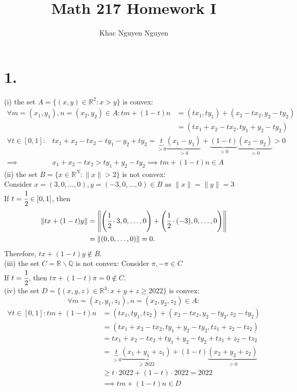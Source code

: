 \documentclass[11pt]{article}
\title{\textbf{Math 217 Homework I}}
\author{Khac Nguyen Nguyen}
\date{}
\begin{document}
\section*{1.}
(i) the set $ A = \{ (x,y) \in \mathbb{R}^2: x>y \}$ is convex:
\begin{equation*}
\begin{aligned}
\forall m = (x_1,y_1), n=(x_2,y_2) \in A: tm+ (1-t)n &= (tx_1, ty_1) + (x_2-tx_2, y_2 -ty_2) \\
&= (tx_1+x_2-tx_2,ty_1+y_2 - ty_2)
\end{aligned}
\end{equation*}
\begin{equation*}
\begin{aligned}
\forall t \in [0,1]: &tx_1+x_2-tx_2 - ty_1 -y_2 + ty_2 = \underbrace{t}_{>0} \underbrace{(x_1-y_1)}_{>0} + \underbrace{(1-t)}_{>0} \underbrace{(x_2 - y_2)}_{>0} > 0 \\
\implies & x_1+x_2-tx_2 > ty_1+y_2 -ty_2 \implies tm+(1-t)n \in A
\end{aligned}
\end{equation*}	
(ii) the set $B= \{x \in \mathbb{R}^N: \|x\|>2\} $ is not convex: \\
Consider $x = (3,0, \ldots, 0), y = (-3,0, \ldots, 0) \in B \text{ as } \|x\|= \|y\| = 3 $ \\
If $t=\cfrac{1}{2} \in [0,1]$, then 
\begin{equation*}
\begin{aligned}
\|tx+(1-t)y\| &= \left\|\left(\cfrac{1}{2} \cdot 3, 0, \ldots, 0\right) + \left(\cfrac{1}{2} \cdot (-3), 0, \ldots, 0\right) \right\| \\
&= \|(0,0,\ldots, 0)\| = 0.
\end{aligned}
\end{equation*}
Therefore,  $tx+(1-t)y \notin B$. \\
(iii) the set $C = \mathbb{R} \backslash \mathbb{Q} $ is not convex:
Consider $\pi, -\pi \in C$ \\
If $t=\cfrac{1}{2}$, then $t\pi + (1-t)\pi = 0 \notin C$. \\
(iv) the set $ D = \{ (x,y,z) \in \mathbb{R}^3: x+y+z\ge 2022\}$ is convex:
\[\forall m = (x_1,y_1,z_1), n=(x_2,y_2,z_2) \in A: \]
\begin{equation*}
\begin{aligned}
\forall t \in [0,1]: tm+ (1-t)n &= (tx_1, ty_1, tz_2) + (x_2-tx_2, y_2 -ty_2, z_2 - ty_2) \\
&= (tx_1+x_2-tx_2,ty_1+y_2 - ty_2, tz_1+z_2 - tz_2) \\
&=tx_1+x_2-tx_2+ty_1 +y_2 - ty_2 + tz_1 + z_2 -tz_2 \\
&= \underbrace{t}_{>0} \underbrace{(x_1+y_1+z_1)}_{\ge 2022} + (1-t) \underbrace{(x_2+ y_2+z_2)}_{>0} \\ 
&\ge  t \cdot 2022 + (1-t) \cdot 2022 = 2022 \\
&\implies tm+(1-t)n \in D
\end{aligned}
\end{equation*}	
\pagebreak
\end{document}
